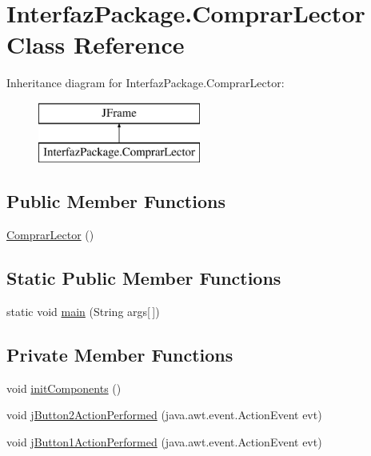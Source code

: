 \hypertarget{class_interfaz_package_1_1_comprar_lector}{}\section{Interfaz\+Package.\+Comprar\+Lector Class Reference}
\label{class_interfaz_package_1_1_comprar_lector}
Inheritance diagram for Interfaz\+Package.\+Comprar\+Lector\+:\begin{figure}[H]
\begin{center}
\leavevmode
\includegraphics[height=2.000000cm]{class_interfaz_package_1_1_comprar_lector}
\end{center}
\end{figure}
\subsection*{Public Member Functions}
\begin{DoxyCompactItemize}
\item 
\mbox{\hyperlink{class_interfaz_package_1_1_comprar_lector_a8df28b89646bb4ca519fe3af6ca554c9}{Comprar\+Lector}} ()
\end{DoxyCompactItemize}
\subsection*{Static Public Member Functions}
\begin{DoxyCompactItemize}
\item 
static void \mbox{\hyperlink{class_interfaz_package_1_1_comprar_lector_a3884254a34d91bf1423ec3f2ee38b929}{main}} (String args\mbox{[}$\,$\mbox{]})
\end{DoxyCompactItemize}
\subsection*{Private Member Functions}
\begin{DoxyCompactItemize}
\item 
void \mbox{\hyperlink{class_interfaz_package_1_1_comprar_lector_a2f43f6b60900e6da4cb02eb426b9e6a8}{init\+Components}} ()
\item 
void \mbox{\hyperlink{class_interfaz_package_1_1_comprar_lector_a67a613921bca8746fa553f8d7f28b6eb}{j\+Button2\+Action\+Performed}} (java.\+awt.\+event.\+Action\+Event evt)
\item 
void \mbox{\hyperlink{class_interfaz_package_1_1_comprar_lector_a9466015e1f3d9facbd8b16cb18f5d893}{j\+Button1\+Action\+Performed}} (java.\+awt.\+event.\+Action\+Event evt)
\end{DoxyCompactItemize}
